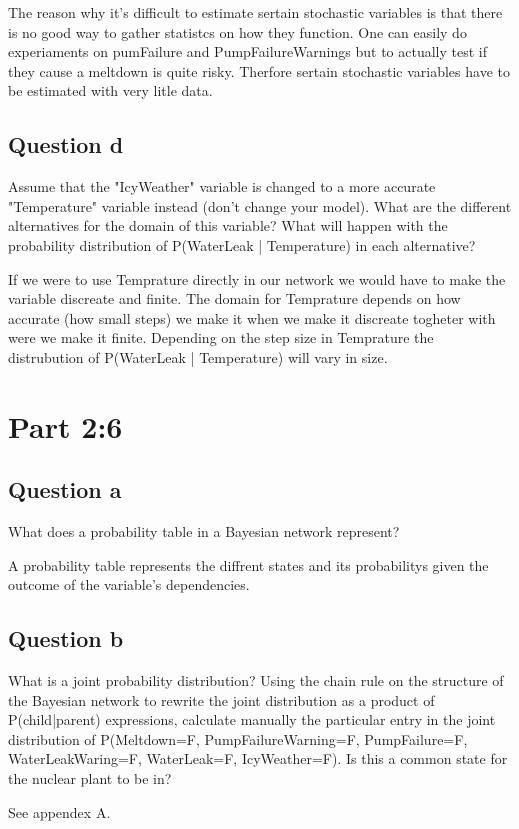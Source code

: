 \documentclass[a4paper,12pt]{article}
\begin{document}
The reason why it's difficult to estimate sertain stochastic variables is that there is no good way to gather statistcs on how they function. One can easily do experiaments on pumFailure and PumpFailureWarnings but to actually test if they cause a meltdown is quite risky. Therfore sertain stochastic variables have to be estimated with very litle data. 

\subsection*{Question d} Assume that the "IcyWeather" variable is changed to a more accurate "Temperature" variable instead (don't change your model). What are the different alternatives for the domain of this variable? What will happen with the probability distribution of P(WaterLeak | Temperature) in each alternative?

If we were to use Temprature directly in our network we would have to make the variable discreate and finite. The domain for Temprature depends on how accurate (how small steps) we make it when we make it discreate togheter with were we make it finite. Depending on the step size in Temprature the distrubution of P(WaterLeak | Temperature) will vary in size.

\section*{Part 2:6}
\subsection*{Question a} 
What does a probability table in a Bayesian network represent?

A probability table represents the diffrent states and its probabilitys given the outcome of the variable's dependencies.

\subsection*{Question b} 
What is a joint probability distribution? Using the chain rule on the structure of the Bayesian network to rewrite the joint distribution as a product of P(child|parent) expressions, calculate manually the particular entry in the joint distribution of P(Meltdown=F, PumpFailureWarning=F, PumpFailure=F, WaterLeakWaring=F, WaterLeak=F, IcyWeather=F). Is this a common state for the nuclear plant to be in?

See appendex A.
\end{document}
